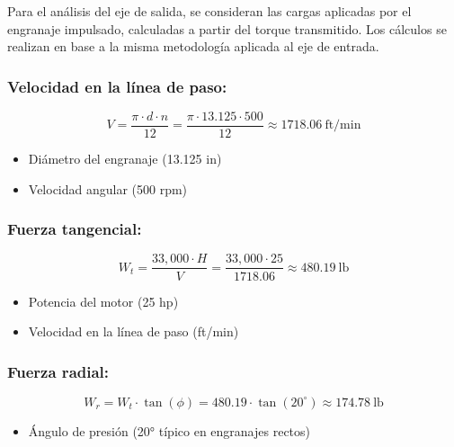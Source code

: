 \documentclass[12pt]{article}
\begin{document}
Para el análisis del eje de salida, se consideran las cargas aplicadas por el engranaje impulsado, calculadas a partir del torque transmitido. Los cálculos se realizan en base a la misma metodología aplicada al eje de entrada.

\vspace{0.2cm}

\noindent


\subsubsection{Velocidad en la línea de paso:}
\begin{equation}
V = \frac{\pi \cdot d \cdot n}{12} = \frac{\pi \cdot 13.125 \cdot 500}{12} \approx 1718.06\ \text{ft/min}
\end{equation}
\begin{itemize}[leftmargin=2cm,nosep]
    \item[$d$:] Diámetro del engranaje (13.125 in)
    \item[$n$:] Velocidad angular (500 rpm)
\end{itemize}

\vspace{0.2cm}

\noindent
\subsubsection{Fuerza tangencial:}
\begin{equation}
W_t = \frac{33,000 \cdot H}{V} = \frac{33,000 \cdot 25}{1718.06} \approx 480.19\ \text{lb}
\end{equation}
\begin{itemize}[leftmargin=2cm,nosep]
    \item[$H$:] Potencia del motor (25 hp)
    \item[$V$:] Velocidad en la línea de paso (ft/min)
\end{itemize}

\vspace{0.2cm}

\noindent
\subsubsection{Fuerza radial:}
\begin{equation}
W_r = W_t \cdot \tan(\phi) = 480.19 \cdot \tan(20^\circ) \approx 174.78\ \text{lb}
\end{equation}
\begin{itemize}[leftmargin=2cm,nosep]
    \item[$\phi$:] Ángulo de presión (20° típico en engranajes rectos)
\end{itemize}
\end{document}
